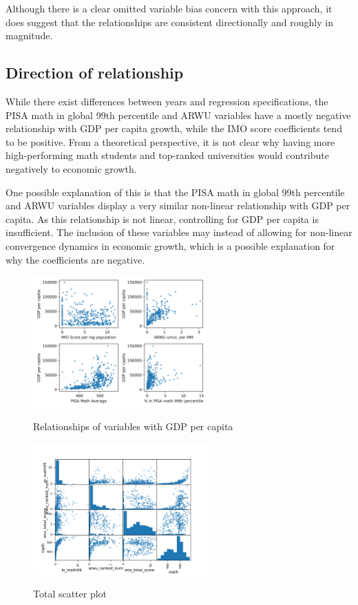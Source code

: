 \documentclass[11pt]{article}
\begin{document}
Although there is a clear omitted variable bias concern with this approach, it does suggest that the relationships are consistent directionally and roughly in magnitude.
\subsection{Direction of relationship}
While there exist differences between years and regression specifications, the PISA math in global 99th percentile and ARWU variables have a mostly negative relationship with GDP per capita growth, while the IMO score coefficients tend to be positive. From a theoretical perspective, it is not clear why having more high-performing math students and top-ranked universities would contribute negatively to economic growth.

One possible explanation of this is that the PISA math in global 99th percentile and ARWU variables display a very similar non-linear relationship with GDP per capita. As this relationship is not linear, controlling for GDP per capita is insufficient. The inclusion of these variables may instead of allowing for non-linear convergence dynamics in economic growth, which is a possible explanation for why the coefficients are negative.

\begin{figure}[H]
    \caption{Relationships of variables with GDP per capita}
    \centering
    \includegraphics[width=0.6\textwidth]{../charts/relationships-gdp-pc.png}
    \label{fig:relationships-gdppc}
\end{figure}


\begin{figure}[H]
    \caption{Total scatter plot}
    \centering
    \includegraphics[width=0.6\textwidth]{../build/total.png}
    \label{fig:relationships-all}
\end{figure}
\end{document}
